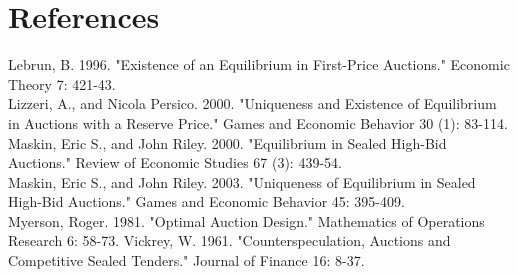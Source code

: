 \documentclass[10pt]{article}
\begin{document}
\section*{References}
Lebrun, B. 1996. "Existence of an Equilibrium in First-Price Auctions." Economic Theory 7: 421-43.\\
Lizzeri, A., and Nicola Persico. 2000. "Uniqueness and Existence of Equilibrium in Auctions with a Reserve Price." Games and Economic Behavior 30 (1): 83-114.\\
Maskin, Eric S., and John Riley. 2000. "Equilibrium in Sealed High-Bid Auctions." Review of Economic Studies 67 (3): 439-54.\\
Maskin, Eric S., and John Riley. 2003. "Uniqueness of Equilibrium in Sealed High-Bid Auctions." Games and Economic Behavior 45: 395-409.\\
Myerson, Roger. 1981. "Optimal Auction Design." Mathematics of Operations Research 6: 58-73. Vickrey, W. 1961. "Counterspeculation, Auctions and Competitive Sealed Tenders." Journal of Finance 16: 8-37.
\end{document}
